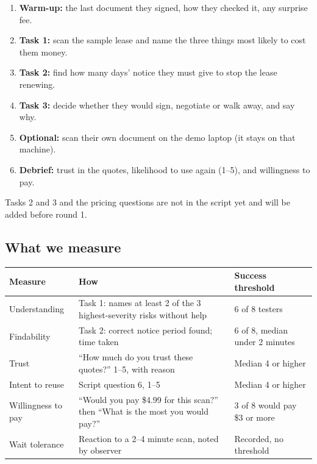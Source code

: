 \documentclass[11pt,letterpaper]{article}
\begin{document}
\begin{enumerate}
  \item \textbf{Warm-up:} the last document they signed, how they checked it, any surprise fee.
  \item \textbf{Task 1:} scan the sample lease and name the three things most likely to cost them money.
  \item \textbf{Task 2:} find how many days' notice they must give to stop the lease renewing.
  \item \textbf{Task 3:} decide whether they would sign, negotiate or walk away, and say why.
  \item \textbf{Optional:} scan their own document on the demo laptop (it stays on that machine).
  \item \textbf{Debrief:} trust in the quotes, likelihood to use again (1--5), and willingness to pay.
\end{enumerate}

Tasks 2 and 3 and the pricing questions are not in the script yet and will be added before round 1.

\subsection{What we measure}

\begin{table}[htbp]
\centering
\small
\begin{tabularx}{\textwidth}{@{}p{2.6cm}Lp{3.4cm}@{}}
\toprule
\textbf{Measure} & \textbf{How} & \textbf{Success threshold} \\
\midrule
Understanding & Task 1: names at least 2 of the 3 highest-severity risks without help & 6 of 8 testers \\
Findability & Task 2: correct notice period found; time taken & 6 of 8, median under 2 minutes \\
Trust & ``How much do you trust these quotes?'' 1--5, with reason & Median 4 or higher \\
Intent to reuse & Script question 6, 1--5 & Median 4 or higher \\
Willingness to pay & ``Would you pay \$4.99 for this scan?'' then ``What is the most you would pay?'' & 3 of 8 would pay \$3 or more \\
Wait tolerance & Reaction to a 2--4 minute scan, noted by observer & Recorded, no threshold \\
\bottomrule
\end{tabularx}
\end{table}
\end{document}
